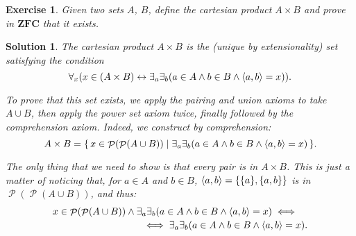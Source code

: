 \documentclass{article}
\newtheorem{ex}{Exercise}
\theoremstyle{nonumberplain}
\newtheorem{sol}{Solution}
\DeclarePairedDelimiter{\braket}{\langle}{\rangle}
\DeclareMathOperator{\powerset}{\mathcal{P}}
\newcommand{\ZFC}{\mathbf{ZFC}}
\begin{document}
\begin{ex}
Given two sets $A$, $B$, define the cartesian product $A \times B$ and prove in $\ZFC$ that it exists.
\end{ex}

\begin{sol}
The cartesian product $A \times B$ is the (unique by extensionality) set satisfying the condition
\begin{equation}
\forall_x (x \in (A \times B) \leftrightarrow \exists_a \exists_b (a \in A \land b \in B \land \braket{a,b} = x)).
\end{equation}

To prove that this set exists, we apply the pairing and union axioms to take $A \cup B$, then apply the power set axiom twice, finally followed by the comprehension axiom. Indeed, we construct by comprehension:
\begin{equation}
A \times B = \{\,x \in \powerset(\powerset(A \cup B)) \mid \exists_a \exists_b (a \in A \land b \in B \land \braket{a,b} = x)\,\}.
\end{equation}

The only thing that we need to show is that every pair is in $A \times B$. This is just a matter of noticing that, for $a \in A$ and $b \in B$, $\braket{a,b} = \{\{a\},\{a,b\}\}$ is in $\powerset(\powerset(A \cup B))$, and thus:
\begin{equation}
\begin{multlined}
x \in \powerset(\powerset(A \cup B)) \land \exists_a \exists_b (a \in A \land b \in B \land \braket{a,b} = x) \iff \\
\iff \exists_a \exists_b (a \in A \land b \in B \land \braket{a,b} = x).
\end{multlined}
\end{equation}
\end{sol}
\end{document}
